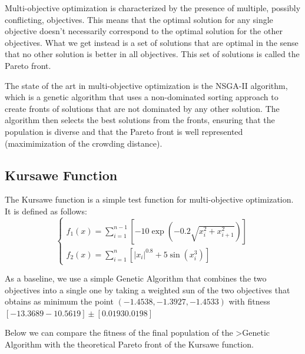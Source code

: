 Multi-objective optimization is characterized by the presence of multiple, possibly conflicting, objectives. This means that the optimal solution for any single objective doesn't necessarily correspond to the optimal solution for the other objectives. What we get instead is a set of solutions that are optimal in the sense that no other solution is better in all objectives. This set of solutions is called the Pareto front.

The state of the art in multi-objective optimization is the NSGA-II algorithm, which is a genetic algorithm that uses a non-dominated sorting approach to create fronts of solutions that are not dominated by any other solution. The algorithm then selects the best solutions from the fronts, ensuring that the population is diverse and that the Pareto front is well represented (maximimization of the crowding distance).

\subsection{Kursawe Function}
The Kursawe function is a simple test function for multi-objective optimization. It is defined as follows:
\begin{equation}
    \begin{cases}
        f_1(x) = \sum_{i=1}^{n-1} \left[ -10 \exp\left(-0.2\sqrt{x_i^2 + x_{i+1}^2}\right) \right] \\
        f_2(x) = \sum_{i=1}^{n} \left[ \left| x_i \right|^{0.8} + 5 \sin(x_i^3) \right]
    \end{cases}
\end{equation}

As a baseline, we use a simple Genetic Algorithm that combines the two objectives into a single one by taking a weighted sun of the two objectives that obtains as minimum the point $(-1.4538, -1.3927, -1.4533)$ with fitness $[-13.3689 -10.5619] \pm [0.0193 0.0198]$

Below we can compare the fitness of the final population of the >Genetic Algorithm with the theoretical Pareto front of the Kursawe function.

